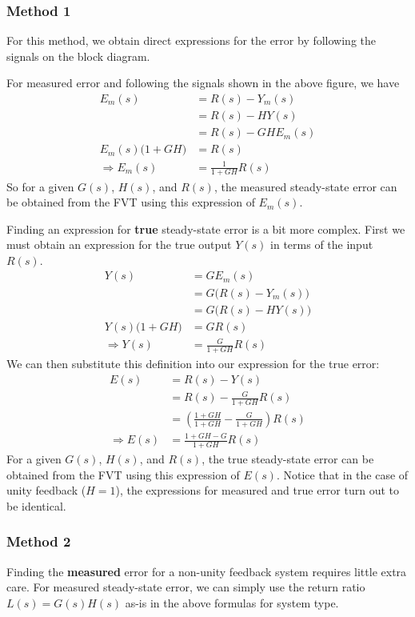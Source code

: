 \documentclass{book}
\begin{document}
\subsubsection*{Method 1}
For this method, we obtain direct expressions for the error by following the signals on the block diagram.

For measured error and following the signals shown in the above figure, we have
\begin{align*}
	E_m(s) &= R(s) - Y_m(s) \\
	&= R(s) - HY(s) \\
	&= R(s) - GHE_m(s) \\
	E_m(s)\big(1+GH\big)&=R(s) \\
	\Rightarrow E_m(s) &= \frac{1}{1+GH}R(s) 
\end{align*}
So for a given $ G(s) $, $ H(s) $, and $ R(s) $, the measured steady-state error can be obtained from the FVT using this expression of $ E_m(s) $.

Finding an expression for \textbf{true} steady-state error is a bit more complex. First we must obtain an expression for the true output $ Y(s) $ in terms of the input $ R(s) $.
\begin{align*}
Y(s) &= G E_m(s) \\
&= G\big(R(s) - Y_m(s)\big) \\
&= G\big(R(s) - HY(s)\big) \\
Y(s)\big(1+GH\big)&=GR(s) \\
\Rightarrow Y(s) &= \frac{G}{1+GH}R(s) 
\end{align*}
We can then substitute this definition into our expression for the true error:
\begin{align*}
E(s) &= R(s) - Y(s) \\
&= R(s) - \frac{G}{1+GH}R(s)  \\
&= \left(\frac{1+GH}{1+GH} - \frac{G}{1+GH} \right)R(s) \\
\Rightarrow E(s) &= \frac{1+GH-G}{1+GH}R(s) 
\end{align*}
For a given $ G(s) $, $ H(s) $, and $ R(s) $, the true steady-state error can be obtained from the FVT using this expression of $ E(s) $. Notice that in the case of unity feedback ($ H=1 $), the expressions for measured and true error turn out to be identical.

\subsubsection*{Method 2}
Finding the \textbf{measured} error for a non-unity feedback system requires little extra care. For measured steady-state error, we can simply use the return ratio $ L(s) = G(s)H(s) $ as-is in the above formulas for system type. 
\end{document}
